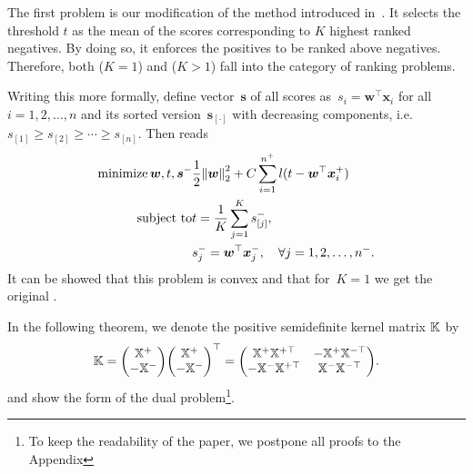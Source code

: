 The first problem \TopPushK is our modification of the \TopPush method introduced in~\cite{li2014top}. It selects the threshold $t$ as the mean of the scores corresponding to $K$ highest ranked negatives. By doing so, it enforces the positives to be ranked above negatives. Therefore, both \TopPush ($K=1$) and \TopPushK ($K>1$) fall into the category of ranking problems.

Writing this more formally, define vector~$\bm{s}$ of all scores as~$s_i = \bm{w}^{\top} \bm{x}_i$ for all~$i = 1, 2, \ldots, n$ and its sorted version~$\bm{s}_{[\cdot]}$ with decreasing components, i.e. $s_{[1]} \geq s_{[2]} \geq \cdots  \geq s_{[n]}$. Then \TopPushK reads
\begin{equation}\label{eq:TopPushK primal}
  \begin{aligned}
    \minimize{\bm{w}, t, \bm s^-}
    & \frac{1}{2} \norm{\bm{w}}_{2}^{2} + C \sum_{i = 1}^{n^+} l(t - \bm{w}^{\top}\bm{x}^+_{i}) \\
    \st
    & t = \frac{1}{K}\sum_{j = 1}^{K} s^{-}_{[j]}, \\
    & s_j^- = \bm{w}^\top \bm x_j^-, \quad \forall j = 1, 2, \ldots, n^-.
  \end{aligned}
\end{equation}
It can be showed that this problem is convex and that for~$K = 1$ we get the original \TopPush.

In the following theorem, we denote the positive semidefinite kernel matrix $\mathbb{K}$ by
\begin{equation}\label{eq:kernel_linear}
  \K = \Matrix{\X^+ \\ - \X^-} \Matrix{\X^+ \\ - \X^-}^\top = \Matrix{\X^+ \X^{+\top} & -\X^+ \X^{-\top} \\ -\X^- \X^{+\top} & \X^- \X^{-\top} }.
\end{equation}
and show the form of the \TopPushK dual problem\footnote{To keep the readability of the paper, we postpone all proofs to the Appendix}.

